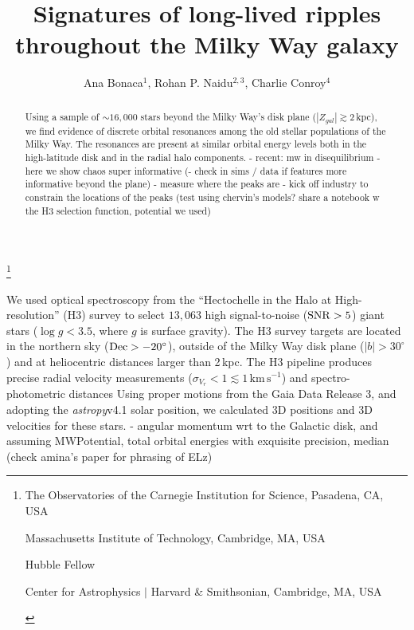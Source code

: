 \documentclass{natureprintstyle}
\title{Signatures of long-lived ripples throughout the Milky Way galaxy}
\author{Ana Bonaca$^1$, Rohan P. Naidu$^{2,3}$, Charlie Conroy$^4$}
\newcommand{\kms}{\ensuremath{\textrm{km}\,\textrm{s}^{-1}}}
\newcommand{\package}[1]{\textsl{#1}}
\begin{document}
\maketitle

\let\thefootnote\relax\footnote{

\begin{affiliations}
\item The Observatories of the Carnegie Institution for Science, Pasadena, CA, USA

\item Massachusetts Institute of Technology, Cambridge, MA, USA
\item Hubble Fellow

\item Center for Astrophysics $|$ Harvard \& Smithsonian,  Cambridge, MA, USA

  
\end{affiliations}
}

\vspace{-3.5mm}
\begin{abstract}
Using a sample of $\sim16,000$ stars beyond the Milky Way's disk plane ($|Z_{gal}|\gtrsim2$\,kpc), we find evidence of discrete orbital resonances among the old stellar populations of the Milky Way. 
The resonances are present at similar orbital energy levels both in the high-latitude disk and in the radial halo components.
- recent: mw in disequilibrium
- here we show chaos super informative
(- check in sims / data if features more informative beyond the plane)
- measure where the peaks are
- kick off industry to constrain the locations of the peaks (test using chervin's models? share a notebook w the H3 selection function, potential we used)
\end{abstract}

\vspace{1cm}


We used optical spectroscopy from the ``Hectochelle in the Halo at High-resolution'' (H3) survey\cite{conroy:2019} to select $13,063$ high signal-to-noise ($\rm{SNR}>5$) giant stars ($\log g<3.5$, where $g$ is surface gravity).
The H3 survey targets are located in the northern sky ($\rm{Dec}>-20^\circ$), outside of the Milky Way disk plane ($|b|>30^\circ$) and at heliocentric distances larger than 2\,kpc.
The H3 pipeline\cite{} produces precise radial velocity measurements ($\sigma_{V_r}<1\lesssim1\,\kms$) and spectro-photometric distances 
Using proper motions from the Gaia Data Release 3\cite{}, and adopting the \package{astropy}v4.1 solar position\cite{}, we calculated 3D positions and 3D velocities for these stars.
- angular momentum wrt to the Galactic disk, and assuming MWPotential, total orbital energies with exquisite precision, median  (check amina's paper for phrasing of ELz)
\end{document}
